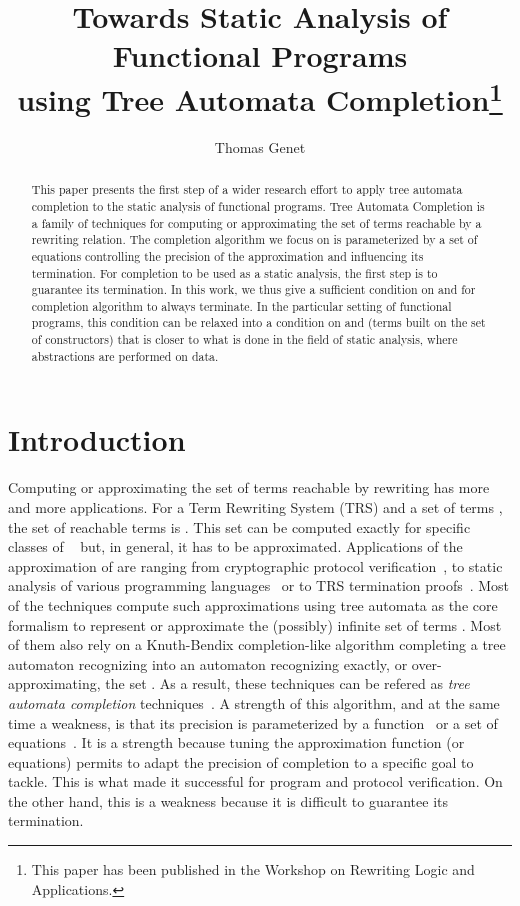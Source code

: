 \documentclass[a4paper,11pt]{llncs}
\author{Thomas Genet}
\title{Towards Static Analysis of Functional Programs
\\ using Tree Automata Completion\thanks{This paper has been published in the
  Workshop on Rewriting Logic and Applications\cite{Genet-WRLA14}.}}
\institute{INRIA/IRISA, Universit\'e de Rennes, France\\
{\tt genet@irisa.fr}}
\theoremstyle{plain}
\begin{document}
\maketitle

\begin{abstract}
This paper presents the first step of a wider research effort to 
apply tree automata completion to the static analysis of functional programs. 
Tree Automata Completion is a family of techniques for computing or
approximating the set of terms reachable by a rewriting relation. 
The completion algorithm we focus on is parameterized by a set  of equations
controlling the precision of the approximation and influencing its termination.
For completion to be used as a static analysis, the first step is to guarantee
its termination. In this work, we thus give a sufficient condition on  and
 for completion algorithm to always terminate. 
In the particular setting of functional programs, this condition can be 
relaxed into a condition on  and  (terms built on the set of
constructors) that is closer to what is done in the field of static analysis,
where abstractions are performed on data.
\end{abstract}


\section{Introduction}
Computing or approximating the set of terms reachable by rewriting
has more and more applications. For a Term Rewriting System (TRS)  and a
set of terms , the set of reachable terms is . This set can be computed exactly for
specific classes of ~\cite{Genet-Habil} but, in general, it has to be
approximated. Applications of the approximation of  are ranging from
cryptographic protocol verification~\cite{avispa}, to static
analysis of various programming languages~\cite{BoichutGJL-RTA07}
or to TRS termination proofs~\cite{GeserHWZ-RTA05}. Most of
the techniques compute such approximations using tree automata as the core
formalism to represent or approximate the (possibly) infinite set of terms
. Most of them also rely on a Knuth-Bendix completion-like algorithm
completing a tree automaton  recognizing  into an automaton 
recognizing exactly, or over-approximating, the set . As a result,
these techniques can be refered as {\em tree automata completion}
techniques~\cite{Genet-RTA98,Takai-RTA04,FeuilladeGVTT-JAR04,BoichutCHK-IJFCS09,GenetR-JSC10,Lisitsa-RTA12}.
A strength of this algorithm, and at the same time a weakness, is that its
precision is parameterized by a function~\cite{FeuilladeGVTT-JAR04} or a set of
equations~\cite{GenetR-JSC10}. It is a strength because tuning the approximation
function (or equations) permits to adapt the precision of completion to a
specific goal to tackle. This is what made it successful for program and
protocol verification. On the other hand, this is a weakness because it is
difficult to guarantee its termination.
\end{document}
